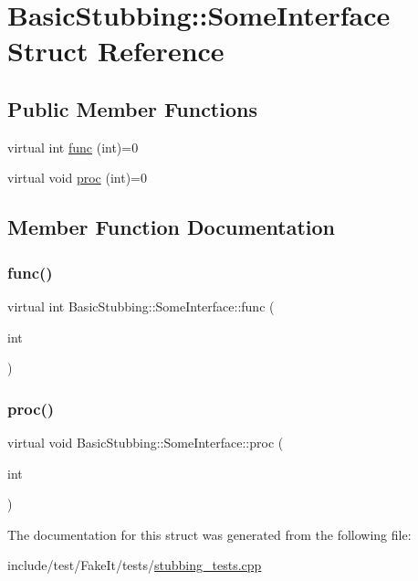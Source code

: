 \hypertarget{structBasicStubbing_1_1SomeInterface}{}\section{Basic\+Stubbing\+::Some\+Interface Struct Reference}
\label{structBasicStubbing_1_1SomeInterface}
\subsection*{Public Member Functions}
\begin{DoxyCompactItemize}
\item 
virtual int \mbox{\hyperlink{structBasicStubbing_1_1SomeInterface_af20a80acbecf7c02a7eca5e7ec97c42d}{func}} (int)=0
\item 
virtual void \mbox{\hyperlink{structBasicStubbing_1_1SomeInterface_af67a818bd75b279e9f32cf80bd334cbf}{proc}} (int)=0
\end{DoxyCompactItemize}


\subsection{Member Function Documentation}
\mbox{\label{structBasicStubbing_1_1SomeInterface_af20a80acbecf7c02a7eca5e7ec97c42d}} 
\subsubsection{\texorpdfstring{func()}{func()}}
{\footnotesize\ttfamily virtual int Basic\+Stubbing\+::\+Some\+Interface\+::func (\begin{DoxyParamCaption}\item[{int}]{ }\end{DoxyParamCaption})\hspace{0.3cm}{\ttfamily [pure virtual]}}

\mbox{\label{structBasicStubbing_1_1SomeInterface_af67a818bd75b279e9f32cf80bd334cbf}} 
\subsubsection{\texorpdfstring{proc()}{proc()}}
{\footnotesize\ttfamily virtual void Basic\+Stubbing\+::\+Some\+Interface\+::proc (\begin{DoxyParamCaption}\item[{int}]{ }\end{DoxyParamCaption})\hspace{0.3cm}{\ttfamily [pure virtual]}}



The documentation for this struct was generated from the following file\+:\begin{DoxyCompactItemize}
\item 
include/test/\+Fake\+It/tests/\mbox{\hyperlink{stubbing__tests_8cpp}{stubbing\+\_\+tests.\+cpp}}\end{DoxyCompactItemize}

